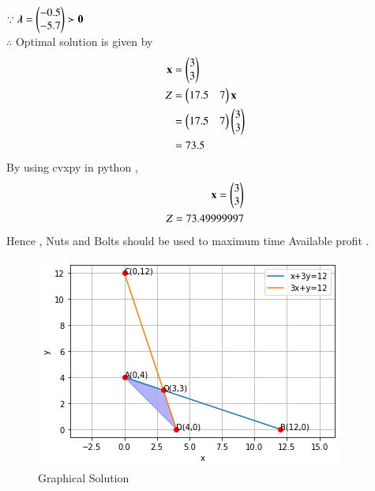 \documentclass[journal,12pt,twocolumn]{IEEEtran}
\begin{document}
$\because \boldsymbol{\lambda}=\begin{pmatrix}-0.5 \\ -5.7\end{pmatrix} \succ \mathbf{0} $
\\
$\therefore$ Optimal solution is given by
\begin{align}
    \mathbf{x} &= \begin{pmatrix}3\\3\end{pmatrix} \\
    Z &= \begin{pmatrix}17.5 & 7\end{pmatrix}\mathbf{x} \\
    &= \begin{pmatrix}17.5 & 7\end{pmatrix}\begin{pmatrix}3 \\ 3\end{pmatrix} \\
    &= 73.5
\end{align}
By using cvxpy in python ,
\begin{align}
    \mathbf{x}=\begin{pmatrix}3\\3\end{pmatrix}\\
    Z = 73.49999997
\end{align}
Hence , Nuts and  Bolts should be used to maximum time Available profit .\\
\begin{figure}[!ht]
\centering
\includegraphics[width=\columnwidth]{download (2).png}
\caption{Graphical Solution}
\label{fig: Graphical Solution}	
\end{figure}
\end{document}
